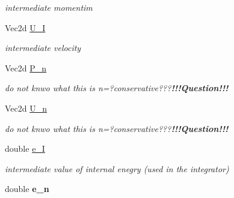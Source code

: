 \begin{CompactItemize}
\begin{CompactList}\small\item\em intermediate momentim \item\end{CompactList}\item 
\hypertarget{classParticle_346aeb99054a013436d225c9df535002}{
Vec2d \hyperlink{classParticle_346aeb99054a013436d225c9df535002}{U\_\-I}}
\label{classParticle_346aeb99054a013436d225c9df535002}

\begin{CompactList}\small\item\em intermediate velocity \item\end{CompactList}\item 
\hypertarget{classParticle_d5c24e7c813bcd558aa40acb8fd84de7}{
Vec2d \hyperlink{classParticle_d5c24e7c813bcd558aa40acb8fd84de7}{P\_\-n}}
\label{classParticle_d5c24e7c813bcd558aa40acb8fd84de7}

\begin{CompactList}\small\item\em do not knwo what this is n=?conservative???{\bf !!!Question!!!} \item\end{CompactList}\item 
\hypertarget{classParticle_9a4a7631b4f39ea1dbfdf9b426ad2e1a}{
Vec2d \hyperlink{classParticle_9a4a7631b4f39ea1dbfdf9b426ad2e1a}{U\_\-n}}
\label{classParticle_9a4a7631b4f39ea1dbfdf9b426ad2e1a}

\begin{CompactList}\small\item\em do not knwo what this is n=?conservative???{\bf !!!Question!!!} \item\end{CompactList}\item 
\hypertarget{classParticle_2a993ea8900f2f84595599fb18224bde}{
double \hyperlink{classParticle_2a993ea8900f2f84595599fb18224bde}{e\_\-I}}
\label{classParticle_2a993ea8900f2f84595599fb18224bde}

\begin{CompactList}\small\item\em intermediate value of internal enegry (used in the integrator) \item\end{CompactList}\item 
\hypertarget{classParticle_79b451e92d70e0b029820c528a346499}{
double \textbf{e\_\-n}}
\label{classParticle_79b451e92d70e0b029820c528a346499}


\end{CompactItemize}
